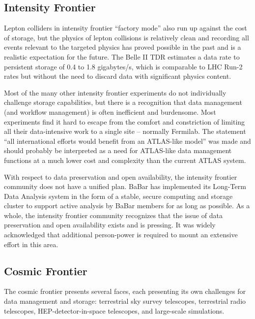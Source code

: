 \subsection{Intensity Frontier}
Lepton colliders in intensity frontier ``factory mode'' also run up against the cost of storage, 
but the physics of lepton collisions is relatively clean and recording all events relevant to the 
targeted physics has proved possible in the past and is a realistic expectation for the future.  
The Belle II TDR estimates a data rate to persistent storage of 0.4 to 1.8 gigabytes/s, which is 
comparable to LHC Run-2 rates but without the need to discard data with significant physics content.

Most of the many other intensity frontier experiments do not individually challenge storage 
capabilities, but there is a recognition that data management (and workflow management) is 
often inefficient and burdensome. Most experiments find it hard to escape from the comfort 
and constriction of limiting all their data-intensive work to a single site -- normally Fermilab. 
The statement ``all international efforts would benefit from an ATLAS-like model'' was made and 
should probably be interpreted as a need for ATLAS-like data management functions at a much 
lower cost and complexity than the current ATLAS system.

With respect to data preservation and open availability, the intensity frontier community 
does not have a unified plan.  BaBar has implemented its Long-Term Data Analysis system in 
the form of a stable, secure computing and storage cluster to support active analysis by 
BaBar members for as long as possible. As a whole, the intensity frontier community recognizes 
that the issue of data preservation and open availability exists and is pressing. It was widely 
acknowledged that additional person-power is required to mount an extensive effort in this area.

\subsection{Cosmic Frontier}
The cosmic frontier presents several faces, each presenting its own challenges for data 
management and storage: terrestrial sky survey telescopes, terrestrial radio telescopes, 
HEP-detector-in-space telescopes, and large-scale simulations.

